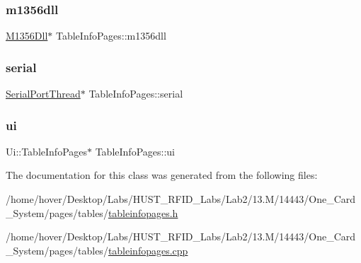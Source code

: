 \mbox{\label{class_table_info_pages_a872072cca279224ba09c34a76c63c404}} 
\subsubsection{\texorpdfstring{m1356dll}{m1356dll}}
{\footnotesize\ttfamily \mbox{\hyperlink{class_m1356_dll}{M1356\+Dll}}$\ast$ Table\+Info\+Pages\+::m1356dll\hspace{0.3cm}{\ttfamily [private]}}

\mbox{\label{class_table_info_pages_a82b9f14a806dec6177ae0242326715b6}} 
\subsubsection{\texorpdfstring{serial}{serial}}
{\footnotesize\ttfamily \mbox{\hyperlink{class_serial_port_thread}{Serial\+Port\+Thread}}$\ast$ Table\+Info\+Pages\+::serial\hspace{0.3cm}{\ttfamily [private]}}

\mbox{\label{class_table_info_pages_a443191ceb391295c9fc39133ceb484a9}} 
\subsubsection{\texorpdfstring{ui}{ui}}
{\footnotesize\ttfamily Ui\+::\+Table\+Info\+Pages$\ast$ Table\+Info\+Pages\+::ui\hspace{0.3cm}{\ttfamily [private]}}



The documentation for this class was generated from the following files\+:\begin{DoxyCompactItemize}
\item 
/home/hover/\+Desktop/\+Labs/\+H\+U\+S\+T\+\_\+\+R\+F\+I\+D\+\_\+\+Labs/\+Lab2/13.\+M/14443/\+One\+\_\+\+Card\+\_\+\+System/pages/tables/\mbox{\hyperlink{tableinfopages_8h}{tableinfopages.\+h}}\item 
/home/hover/\+Desktop/\+Labs/\+H\+U\+S\+T\+\_\+\+R\+F\+I\+D\+\_\+\+Labs/\+Lab2/13.\+M/14443/\+One\+\_\+\+Card\+\_\+\+System/pages/tables/\mbox{\hyperlink{tableinfopages_8cpp}{tableinfopages.\+cpp}}\end{DoxyCompactItemize}
